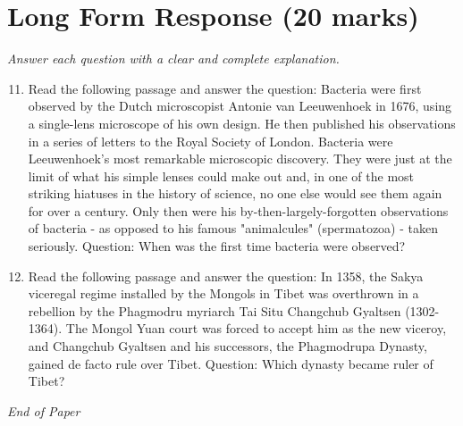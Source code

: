 \documentclass[12pt]{article}
\begin{document}
\section*{Long Form Response (20 marks)}
\textit{Answer each question with a clear and complete explanation.}
\begin{enumerate}[label=\arabic*.]
\setcounter{enumi}{10}
\item Read the following passage and answer the question: Bacteria were first observed by the Dutch microscopist Antonie van Leeuwenhoek in 1676, using a single-lens microscope of his own design. He then published his observations in a series of letters to the Royal Society of London. Bacteria were Leeuwenhoek's most remarkable microscopic discovery. They were just at the limit of what his simple lenses could make out and, in one of the most striking hiatuses in the history of science, no one else would see them again for over a century. Only then were his by-then-largely-forgotten observations of bacteria - as opposed to his famous "animalcules" (spermatozoa) - taken seriously. Question: When was the first time bacteria were observed?
\item Read the following passage and answer the question: In 1358, the Sakya viceregal regime installed by the Mongols in Tibet was overthrown in a rebellion by the Phagmodru myriarch Tai Situ Changchub Gyaltsen (1302-1364). The Mongol Yuan court was forced to accept him as the new viceroy, and Changchub Gyaltsen and his successors, the Phagmodrupa Dynasty, gained de facto rule over Tibet. Question: Which dynasty became ruler of Tibet?
\end{enumerate}

\vfill
\noindent\textit{End of Paper}
\end{document}
